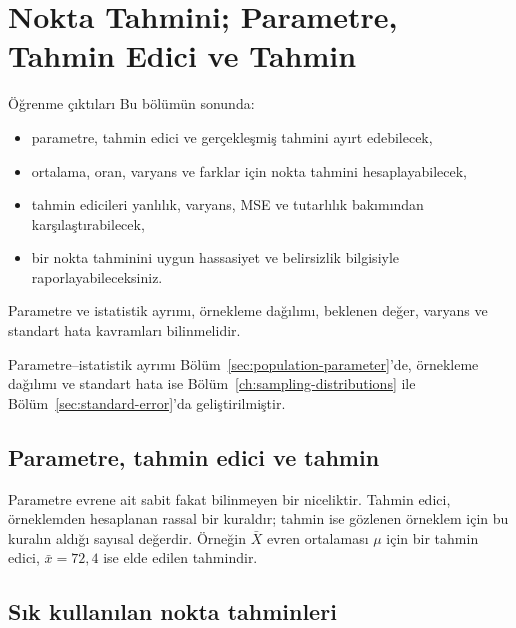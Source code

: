 \chapter{Nokta Tahmini; Parametre, Tahmin Edici ve Tahmin}
\label{ch:point-estimation}

\begin{prismbox}[PrismLight]{Öğrenme çıktıları}
Bu bölümün sonunda:
\begin{itemize}
  \item parametre, tahmin edici ve gerçekleşmiş tahmini ayırt edebilecek,
  \item ortalama, oran, varyans ve farklar için nokta tahmini hesaplayabilecek,
  \item tahmin edicileri yanlılık, varyans, MSE ve tutarlılık bakımından karşılaştırabilecek,
  \item bir nokta tahminini uygun hassasiyet ve belirsizlik bilgisiyle raporlayabileceksiniz.
\end{itemize}
\end{prismbox}

\begin{prerequisitebox}
Parametre ve istatistik ayrımı, örnekleme dağılımı, beklenen değer, varyans
ve standart hata kavramları bilinmelidir.
\end{prerequisitebox}

Parametre--istatistik ayrımı Bölüm~\ref{sec:population-parameter}'de,
örnekleme dağılımı ve standart hata ise Bölüm~\ref{ch:sampling-distributions}
ile Bölüm~\ref{sec:standard-error}'da geliştirilmiştir.

\section{Parametre, tahmin edici ve tahmin}
\label{sec:estimator-estimate}

\begin{definitionbox}
Parametre evrene ait sabit fakat bilinmeyen bir niceliktir. Tahmin edici,
örneklemden hesaplanan rassal bir kuraldır; tahmin ise gözlenen örneklem için
bu kuralın aldığı sayısal değerdir. Örneğin $\bar X$ evren ortalaması $\mu$
için bir tahmin edici, $\bar x=72{,}4$ ise elde edilen tahmindir.
\end{definitionbox}

\section{Sık kullanılan nokta tahminleri}

